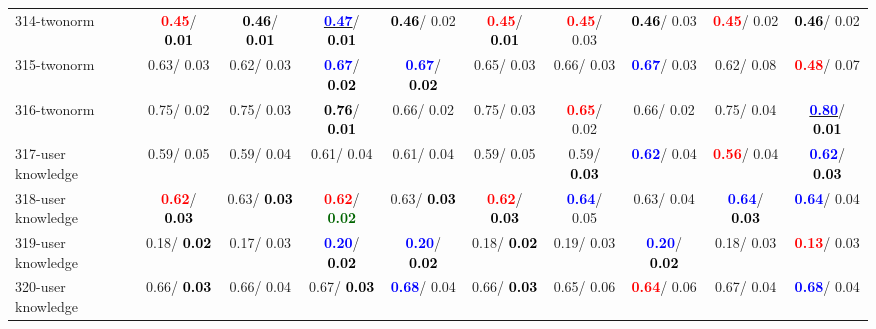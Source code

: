 \begin{table}[h]
\begin{center}
{\begin{tabular}{lc|c|c|c|c|c|c|c|c}
314-twonorm & \textcolor{red}{\textbf{  0.45}}/\textcolor{black}{\textbf{  0.01}} & \textcolor{black}{\textbf{  0.46}}/\textcolor{black}{\textbf{  0.01}} & \underline{\textcolor{blue}{\textbf{  0.47}}}/\textcolor{black}{\textbf{  0.01}} & \textcolor{black}{\textbf{  0.46}}/  0.02 & \textcolor{red}{\textbf{  0.45}}/\textcolor{black}{\textbf{  0.01}} & \textcolor{red}{\textbf{  0.45}}/  0.03 & \textcolor{black}{\textbf{  0.46}}/  0.03 & \textcolor{red}{\textbf{  0.45}}/  0.02 & \textcolor{black}{\textbf{  0.46}}/  0.02 \\
315-twonorm &   0.63/  0.03 &   0.62/  0.03 & \textcolor{blue}{\textbf{  0.67}}/\textcolor{black}{\textbf{  0.02}} & \textcolor{blue}{\textbf{  0.67}}/\textcolor{black}{\textbf{  0.02}} &   0.65/  0.03 &   0.66/  0.03 & \textcolor{blue}{\textbf{  0.67}}/  0.03 &   0.62/  0.08 & \textcolor{red}{\textbf{  0.48}}/  0.07 \\
316-twonorm &   0.75/  0.02 &   0.75/  0.03 & \textcolor{black}{\textbf{  0.76}}/\textcolor{black}{\textbf{  0.01}} &   0.66/  0.02 &   0.75/  0.03 & \textcolor{red}{\textbf{  0.65}}/  0.02 &   0.66/  0.02 &   0.75/  0.04 & \underline{\textcolor{blue}{\textbf{  0.80}}}/\textcolor{black}{\textbf{  0.01}} \\ \hline
317-user knowledge &   0.59/  0.05 &   0.59/  0.04 &   0.61/  0.04 &   0.61/  0.04 &   0.59/  0.05 &   0.59/\textcolor{black}{\textbf{  0.03}} & \textcolor{blue}{\textbf{  0.62}}/  0.04 & \textcolor{red}{\textbf{  0.56}}/  0.04 & \textcolor{blue}{\textbf{  0.62}}/\textcolor{black}{\textbf{  0.03}} \\
318-user knowledge & \textcolor{red}{\textbf{  0.62}}/\textcolor{black}{\textbf{  0.03}} &   0.63/\textcolor{black}{\textbf{  0.03}} & \textcolor{red}{\textbf{  0.62}}/\textcolor{darkgreen}{\textbf{  0.02}} &   0.63/\textcolor{black}{\textbf{  0.03}} & \textcolor{red}{\textbf{  0.62}}/\textcolor{black}{\textbf{  0.03}} & \textcolor{blue}{\textbf{  0.64}}/  0.05 &   0.63/  0.04 & \textcolor{blue}{\textbf{  0.64}}/\textcolor{black}{\textbf{  0.03}} & \textcolor{blue}{\textbf{  0.64}}/  0.04 \\
319-user knowledge &   0.18/\textcolor{black}{\textbf{  0.02}} &   0.17/  0.03 & \textcolor{blue}{\textbf{  0.20}}/\textcolor{black}{\textbf{  0.02}} & \textcolor{blue}{\textbf{  0.20}}/\textcolor{black}{\textbf{  0.02}} &   0.18/\textcolor{black}{\textbf{  0.02}} &   0.19/  0.03 & \textcolor{blue}{\textbf{  0.20}}/\textcolor{black}{\textbf{  0.02}} &   0.18/  0.03 & \textcolor{red}{\textbf{  0.13}}/  0.03 \\
320-user knowledge &   0.66/\textcolor{black}{\textbf{  0.03}} &   0.66/  0.04 &   0.67/\textcolor{black}{\textbf{  0.03}} & \textcolor{blue}{\textbf{  0.68}}/  0.04 &   0.66/\textcolor{black}{\textbf{  0.03}} &   0.65/  0.06 & \textcolor{red}{\textbf{  0.64}}/  0.06 &   0.67/  0.04 & \textcolor{blue}{\textbf{  0.68}}/  0.04 \\\end{tabular}}\label{stratsALCKappa9AllReduxalla}
\end{center}
\end{table}
